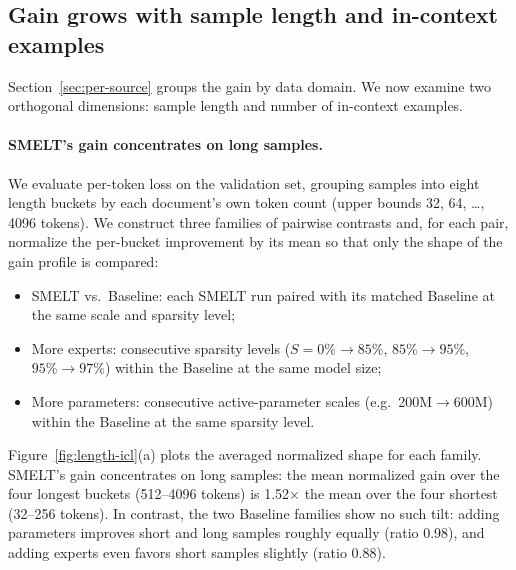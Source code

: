 \documentclass[]{bytedance_seed}
\newcommand{\archname}{SMELT}
\theoremstyle{definition}
\theoremstyle{remark}
\begin{document}
\subsection{Gain grows with sample length and in-context examples}
\label{sec:length-icl}

%
Section~\ref{sec:per-source} groups the gain by data domain.
We now examine two orthogonal dimensions: sample length and number of in-context examples.

\paragraph{\archname{}'s gain concentrates on long samples.}
%
We evaluate per-token loss on the validation set, grouping samples into eight length buckets by each document's own token count (upper bounds 32, 64, \ldots, 4096 tokens).
%
We construct three families of pairwise contrasts and, for each pair, normalize the per-bucket improvement by its mean so that only the shape of the gain profile is compared:
\begin{itemize}\setlength{\itemsep}{0pt}
  \item \archname{} vs.\ Baseline: each \archname{} run paired with its matched Baseline at the same scale and sparsity level;
  \item More experts: consecutive sparsity levels ($S = 0\% \to 85\%$, $85\% \to 95\%$, $95\% \to 97\%$) within the Baseline at the same model size;
  \item More parameters: consecutive active-parameter scales (e.g.\ 200M$\to$600M) within the Baseline at the same sparsity level.
\end{itemize}
%
Figure~\ref{fig:length-icl}(a) plots the averaged normalized shape for each family.
\archname{}'s gain concentrates on long samples: the mean normalized gain over the four longest buckets (512--4096 tokens) is 1.52$\times$ the mean over the four shortest (32--256 tokens).
In contrast, the two Baseline families show no such tilt: adding parameters improves short and long samples roughly equally (ratio 0.98), and adding experts even favors short samples slightly (ratio 0.88).
\end{document}
